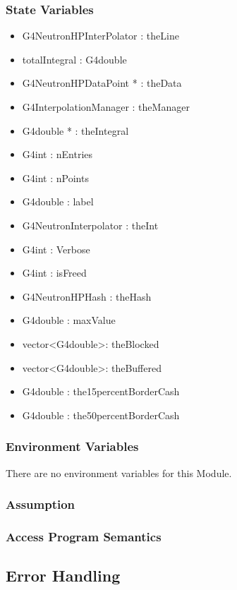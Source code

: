 \documentclass[12pt]{article}
\begin{document}
\subsubsection{State Variables}%
\begin{itemize}
\item G4NeutronHPInterPolator : theLine
\item totalIntegral : G4double
\item G4NeutronHPDataPoint * : theData
\item G4InterpolationManager : theManager
\item G4double * : theIntegral
\item G4int : nEntries
\item G4int : nPoints
\item G4double : label
\item G4NeutronInterpolator : theInt
\item G4int : Verbose
\item G4int : isFreed
\item G4NeutronHPHash : theHash
\item G4double : maxValue
\item vector\textless G4double\textgreater : theBlocked
\item vector\textless G4double\textgreater : theBuffered
\item G4double : the15percentBorderCash
\item G4double : the50percentBorderCash
\end{itemize}

\subsubsection{Environment Variables}%
There are no environment variables for this Module.

\subsubsection{Assumption}%

\subsubsection{Access Program Semantics}%

\subsection{Error Handling}
\end{document}
